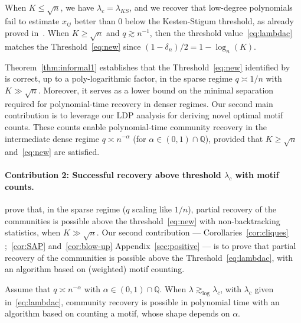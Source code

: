 \documentclass[final]{colt2026}
\newcommand{\1}{\mathbf{1}}
\begin{document}
When $K\leq \sqrt{n}$, we have $\lambda_{c}=\lambda_{KS}$, and we recover that low-degree polynomials fail to estimate $x_{ij}$ better than 0 
below the Kesten-Stigum threshold, as already proved in~\cite{pmlr-v291-chin25a}. 
When $K\geq \sqrt{n}$ and $q\gtrsim n^{-1}$, then the threshold value~\eqref{eq:lambdac} matches the Threshold~\eqref{eq:new} since $(1-\delta_{n})/2=1-\log_{n}(K)$.


 
 Theorem~\ref{thm:informal1} establishes that the Threshold~\eqref{eq:new} identified by~\cite{pmlr-v291-chin25a} is correct, up to a poly-logarithmic factor, in the sparse regime $q\asymp 1/n$ with $K\gg \sqrt{n}$. Moreover, it serves as a lower bound on the minimal separation required for polynomial-time recovery in denser regimes. Our second main contribution is to leverage our LDP analysis for deriving novel optimal motif counts. These counts enable polynomial-time community recovery in the intermediate dense regime $q\asymp n^{-\alpha}$ (for $\alpha\in(0,1)\cap \mathbb{Q}$), provided that $K\geq \sqrt{n}$ and~\eqref{eq:new} are satisfied.

\paragraph{Contribution 2: Successful recovery above threshold $\lambda_{c}$ with motif counts.}
\cite{pmlr-v291-chin25a} prove that, in the sparse regime ($q$ scaling like $1/n$), partial recovery of the communities is possible above the threshold~\eqref{eq:new}  with non-backtracking statistics, when $K\gg \sqrt{n}$. Our second contribution --- Corollaries~\ref{cor:cliques} ;~\ref{cor:SAP} and~\ref{cor:blow-up}  Appendix~\ref{sec:positive} ---  is to prove that partial recovery of the communities is possible above the Threshold~\eqref{eq:lambdac}, with an  algorithm based on (weighted) motif counting.

\begin{theorem}[Informal]\label{thm:informal2}
Assume that $q\asymp n^{-\alpha}$ with $\alpha\in(0,1)\cap \mathbb{Q}$. When $\lambda\gtrsim_{\log} \lambda_{c}$, with $\lambda_{c}$ given in~\eqref{eq:lambdac},
community recovery is possible in polynomial time with an algorithm based on counting a motif, whose shape depends on $\alpha$. 
\end{theorem}
\end{document}
